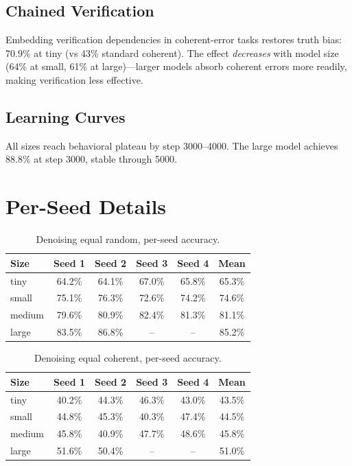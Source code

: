 \documentclass{article}
\begin{document}
\subsection{Chained Verification}

Embedding verification dependencies in coherent-error tasks restores truth bias: 70.9\% at tiny (vs 43\% standard coherent). The effect \emph{decreases} with model size (64\% at small, 61\% at large)---larger models absorb coherent errors more readily, making verification less effective.

\subsection{Learning Curves}

All sizes reach behavioral plateau by step 3000--4000. The large model achieves 88.8\% at step 3000, stable through 5000.

\section{Per-Seed Details}
\label{app:seeds}

\begin{table}[h]
\centering
\small
\begin{tabular}{lccccc}
\toprule
Size & Seed 1 & Seed 2 & Seed 3 & Seed 4 & Mean \\
\midrule
tiny   & 64.2\% & 64.1\% & 67.0\% & 65.8\% & 65.3\% \\
small  & 75.1\% & 76.3\% & 72.6\% & 74.2\% & 74.6\% \\
medium & 79.6\% & 80.9\% & 82.4\% & 81.3\% & 81.1\% \\
large  & 83.5\% & 86.8\% & --     & --     & 85.2\% \\
\bottomrule
\end{tabular}
\caption{Denoising equal random, per-seed accuracy.}
\label{tab:seeds_random}
\end{table}

\begin{table}[h]
\centering
\small
\begin{tabular}{lccccc}
\toprule
Size & Seed 1 & Seed 2 & Seed 3 & Seed 4 & Mean \\
\midrule
tiny   & 40.2\% & 44.3\% & 46.3\% & 43.0\% & 43.5\% \\
small  & 44.8\% & 45.3\% & 40.3\% & 47.4\% & 44.5\% \\
medium & 45.8\% & 40.9\% & 47.7\% & 48.6\% & 45.8\% \\
large  & 51.6\% & 50.4\% & --     & --     & 51.0\% \\
\bottomrule
\end{tabular}
\caption{Denoising equal coherent, per-seed accuracy.}
\label{tab:seeds_coherent}
\end{table}
\end{document}
